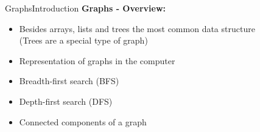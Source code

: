 
\begin{frame}{Graphs}{Introduction}
  \textbf{Graphs - Overview:}
  \begin{itemize}
    \item<2->
      Besides arrays, lists and trees the most common data structure\\
      (Trees are a special type of graph)
    \item<3->
      Representation of graphs in the computer
    \item<4->
      Breadth-first search (BFS)
    \item<5->
      Depth-first search (DFS)
    \item<6->
      Connected components of a graph
  \end{itemize}
\end{frame}

